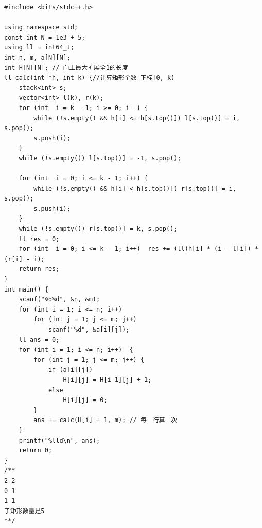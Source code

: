 \begin{verbatim}
#include <bits/stdc++.h>

using namespace std;
const int N = 1e3 + 5;
using ll = int64_t;
int n, m, a[N][N];
int H[N][N]; // 向上最大扩展全1的长度
ll calc(int *h, int k) {//计算矩形个数 下标[0, k)
    stack<int> s;
    vector<int> l(k), r(k);
    for (int  i = k - 1; i >= 0; i--) {
        while (!s.empty() && h[i] <= h[s.top()]) l[s.top()] = i, s.pop();
        s.push(i);
    }
    while (!s.empty()) l[s.top()] = -1, s.pop();
    
    for (int  i = 0; i <= k - 1; i++) {
        while (!s.empty() && h[i] < h[s.top()]) r[s.top()] = i, s.pop();
        s.push(i);
    }
    while (!s.empty()) r[s.top()] = k, s.pop();
    ll res = 0;
    for (int  i = 0; i <= k - 1; i++)  res += (ll)h[i] * (i - l[i]) * (r[i] - i);
    return res;
}
int main() {
    scanf("%d%d", &n, &m);
    for (int i = 1; i <= n; i++) 
        for (int j = 1; j <= m; j++) 
            scanf("%d", &a[i][j]);
    ll ans = 0;
    for (int i = 1; i <= n; i++)  {
        for (int j = 1; j <= m; j++) {
            if (a[i][j])
                H[i][j] = H[i-1][j] + 1;
            else
                H[i][j] = 0;
        }
        ans += calc(H[i] + 1, m); // 每一行算一次
    }
    printf("%lld\n", ans);
    return 0;
}
/**
2 2
0 1
1 1 
子矩形数量是5
**/
\end{verbatim}